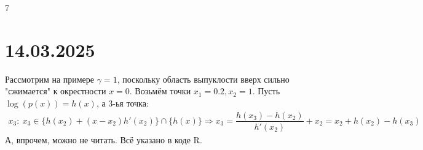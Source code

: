 7\documentclass{article}
\begin{document}
	\section{14.03.2025}
	Рассмотрим на примере $\gamma=1$, поскольку область выпуклости вверх сильно "сжимается" к окрестности $x=0$. Возьмём точки $x_1=0.2, x_2=1$. Пусть $\log(p(x))=h(x)$, а 3-ья точка:
	\begin{align*}
		x_3:~x_3\in\{h(x_2)+(x-x_2)h'(x_2)\}\cap\{h(x)\}\Rightarrow x_3=\dfrac{h(x_3)-h(x_2)}{h'(x_2)} + x_2 = x_2 + h(x_2) - h(x_3)
	\end{align*}
	А, впрочем, можно не читать. Всё указано в коде R.
	
	
\end{document}
